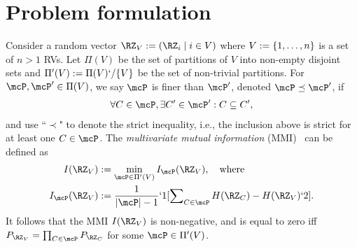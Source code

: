 \section{Problem formulation}
\label{sec:problem}
Consider a random vector $\RZ_V:=(\RZ_i \mid i \in V)$ where $V:=\{1,\dots,n\}$ is a set of $n>1$
RVs. Let $\Pi(V)$ be the set of partitions of $V$ into non-empty disjoint sets and
$\Pi'(V):=\Pi(V)`/\{V\}$ be the set of non-trivial partitions.
For $\mcP, \mcP' \in \Pi(V)$, we say $\mcP$ is finer than $\mcP'$, denoted $\mcP \preceq \mcP'$, if
\begin{align}
	\label{eq:finer}
	\forall C \in \mcP,  \exists  C' \in \mcP' : C \subseteq C',
\end{align}
and use ``$\prec$" to denote the strict inequality, i.e., the inclusion above is strict for at least
one $C \in \mcP$.
The \emph{multivariate mutual information} (MMI)~\cite{chan15mi} can be defined as
\begin{subequations}
	\label{eq:mmi}
	\begin{align}
		I(\RZ_V)&:=\min_{\mcP\in \Pi'(V)} I_{\mcP}(\RZ_V), \kern1em \text{where} \label{eq:I}\\
		I_{\mcP}(\RZ_V)&:= \frac{1}{|\mcP|-1}`1[\sum\nolimits_{C\in \mcP}H(\RZ_C) - H(\RZ_V) `2].\label{eq:IP}
	\end{align}
\end{subequations}
It follows that the MMI $I(\RZ_V)$ is non-negative, and is equal to zero iff $P_{\RZ_V}=\prod_{C\in \mcP}
P_{\RZ_C}$ for some $\mcP \in \Pi'(V)$.

